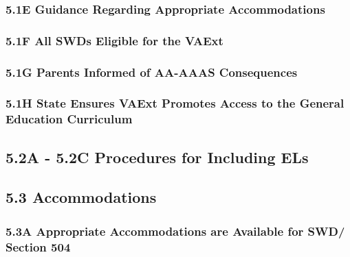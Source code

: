 \documentclass[]{book}
\begin{document}
\hypertarget{e-guidance-regarding-appropriate-accommodations}{%
\subsubsection{5.1E Guidance Regarding Appropriate Accommodations}\label{e-guidance-regarding-appropriate-accommodations}}

\hypertarget{f-all-swds-eligible-for-the-vaext}{%
\subsubsection{5.1F All SWDs Eligible for the VAExt}\label{f-all-swds-eligible-for-the-vaext}}

\hypertarget{g-parents-informed-of-aa-aaas-consequences}{%
\subsubsection{5.1G Parents Informed of AA-AAAS Consequences}\label{g-parents-informed-of-aa-aaas-consequences}}

\hypertarget{h-state-ensures-vaext-promotes-access-to-the-general-education-curriculum}{%
\subsubsection{5.1H State Ensures VAExt Promotes Access to the General Education Curriculum}\label{h-state-ensures-vaext-promotes-access-to-the-general-education-curriculum}}

\hypertarget{a---5.2c-procedures-for-including-els}{%
\subsection{5.2A - 5.2C Procedures for Including ELs}\label{a---5.2c-procedures-for-including-els}}

\hypertarget{accommodations}{%
\subsection{5.3 Accommodations}\label{accommodations}}

\hypertarget{a-appropriate-accommodations-are-available-for-swd-section-504}{%
\subsubsection{5.3A Appropriate Accommodations are Available for SWD/ Section 504}\label{a-appropriate-accommodations-are-available-for-swd-section-504}}
\end{document}
